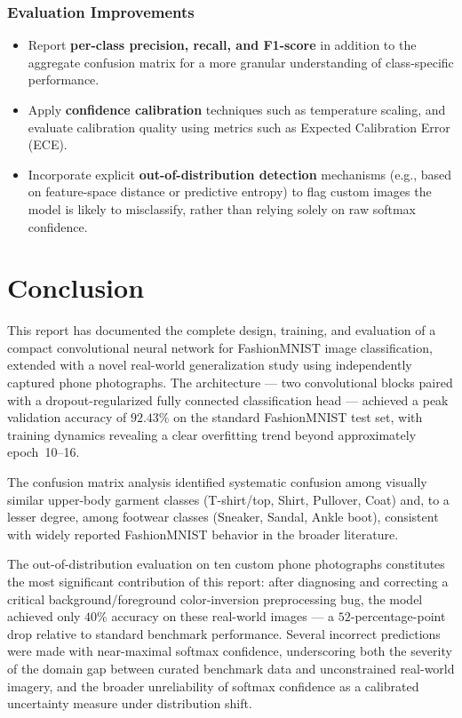 \documentclass[12pt,a4paper]{report}
\begin{document}
\subsection{Evaluation Improvements}
\begin{itemize}
    \item Report \textbf{per-class precision, recall, and F1-score} in addition to the aggregate confusion matrix for a more granular understanding of class-specific performance.
    \item Apply \textbf{confidence calibration} techniques such as temperature scaling, and evaluate calibration quality using metrics such as Expected Calibration Error (ECE).
    \item Incorporate explicit \textbf{out-of-distribution detection} mechanisms (e.g., based on feature-space distance or predictive entropy) to flag custom images the model is likely to misclassify, rather than relying solely on raw softmax confidence.
\end{itemize}

\chapter{Conclusion}

This report has documented the complete design, training, and evaluation of a compact convolutional neural network for FashionMNIST image classification, extended with a novel real-world generalization study using independently captured phone photographs. The architecture — two convolutional blocks paired with a dropout-regularized fully connected classification head — achieved a peak validation accuracy of $92.43\%$ on the standard FashionMNIST test set, with training dynamics revealing a clear overfitting trend beyond approximately epoch~10--16.

The confusion matrix analysis identified systematic confusion among visually similar upper-body garment classes (T-shirt/top, Shirt, Pullover, Coat) and, to a lesser degree, among footwear classes (Sneaker, Sandal, Ankle boot), consistent with widely reported FashionMNIST behavior in the broader literature.

The out-of-distribution evaluation on ten custom phone photographs constitutes the most significant contribution of this report: after diagnosing and correcting a critical background/foreground color-inversion preprocessing bug, the model achieved only $40\%$ accuracy on these real-world images — a $52$-percentage-point drop relative to standard benchmark performance. Several incorrect predictions were made with near-maximal softmax confidence, underscoring both the severity of the domain gap between curated benchmark data and unconstrained real-world imagery, and the broader unreliability of softmax confidence as a calibrated uncertainty measure under distribution shift.
\end{document}
